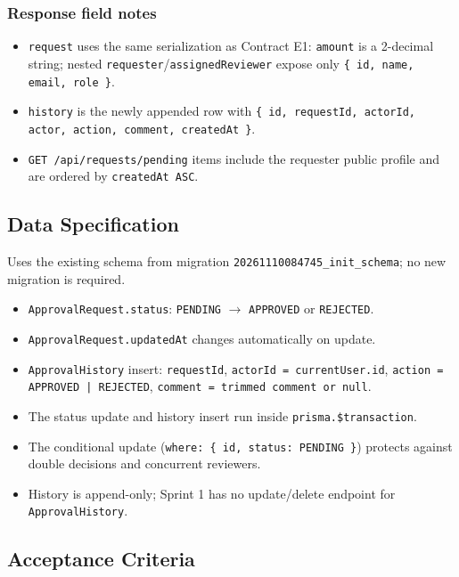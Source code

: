 \documentclass[11pt,a4paper]{article}
\begin{document}
\subsubsection{Response field notes}

\begin{itemize}[leftmargin=*,itemsep=2pt,topsep=2pt]
  \item \texttt{request} uses the same serialization as Contract E1: \texttt{amount} is a 2-decimal string; nested \texttt{requester}/\texttt{assignedReviewer} expose only \texttt{\{ id, name, email, role \}}.
  \item \texttt{history} is the newly appended row with \texttt{\{ id, requestId, actorId, actor, action, comment, createdAt \}}.
  \item \texttt{GET /api/requests/pending} items include the requester public profile and are ordered by \texttt{createdAt ASC}.
\end{itemize}

\subsection{Data Specification}

Uses the existing schema from migration \texttt{20261110084745\_init\_schema}; no new migration is required.\\

\begin{itemize}[leftmargin=*,itemsep=2pt,topsep=2pt]
  \item \texttt{ApprovalRequest.status}: \texttt{PENDING} $\rightarrow$ \texttt{APPROVED} or \texttt{REJECTED}.
  \item \texttt{ApprovalRequest.updatedAt} changes automatically on update.
  \item \texttt{ApprovalHistory} insert: \texttt{requestId}, \texttt{actorId = currentUser.id}, \texttt{action = APPROVED | REJECTED}, \texttt{comment = trimmed comment or null}.
  \item The status update and history insert run inside \texttt{prisma.\$transaction}.
  \item The conditional update (\texttt{where: \{ id, status: PENDING \}}) protects against double decisions and concurrent reviewers.
  \item History is append-only; Sprint 1 has no update/delete endpoint for \texttt{ApprovalHistory}.
\end{itemize}

\subsection{Acceptance Criteria}
\end{document}
